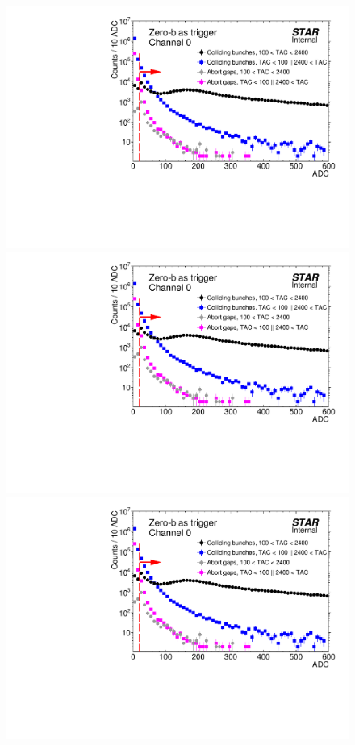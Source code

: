 \begin{figure}[hb]
{}~
\parbox{0.327\textwidth}{
  \centering
  \includegraphics[width=\linewidth,page=22]{graphics/eventSelection/bbc/Bbc_ADC.pdf}\\
  \includegraphics[width=\linewidth,page=23]{graphics/eventSelection/bbc/Bbc_ADC.pdf}\\
  \includegraphics[width=\linewidth,page=24]{graphics/eventSelection/bbc/Bbc_ADC.pdf}\\
}
\end{figure}
